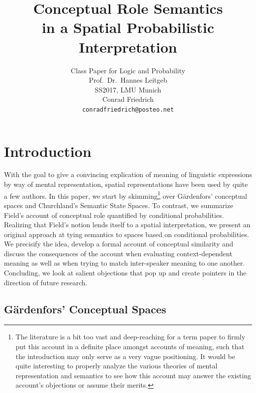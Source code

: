 \documentclass[11pt, a4paper]{scrartcl}
\title{\osfamily{}Conceptual Role Semantics \\ in a Spatial Probabilistic Interpretation}
\author{Class Paper for Logic and Probability \\ Prof.\ Dr.\ Hannes Leitgeb \\ SS2017, LMU Munich \\ Conrad Friedrich \\ \texttt{conradfriedrich@posteo.net}}
\begin{document}
\maketitle
{}
\thispagestyle{empty}
\newpage
\tableofcontents
\newpage
\section{Introduction}

With the goal to give a convincing explication of meaning of linguistic expressions by way of mental representation, spatial representations have been used by quite a few authors. In this paper, we start by skimming\footnote{The literature is a bit too vast and deep-reaching for a term paper to firmly put this account in a definite place amongst accounts of meaning, such that the introduction may only serve as a very vague positioning. It would be quite interesting to properly analyze the various theories of mental representation and semantics to see how this account may answer the existing account's objections or assume their merits.} over Gärdenfors' conceptual spaces and Churchland's Semantic State Spaces. To contrast, we summarize Field's account of conceptual role quantified by conditional probabilities. Realizing that Field's notion lends itself to a spatial interpretation, we present an original approach at tying semantics to spaces based on conditional probabilities. We precisify the idea, develop a formal account of conceptual similarity and discuss the consequences of the account when evaluating context-dependent meaning as well as when trying to match inter-speaker meaning to one another. Concluding, we look at salient objections that pop up and create pointers in the direction of future research.\subsection{Gärdenfors' Conceptual Spaces}
\end{document}
